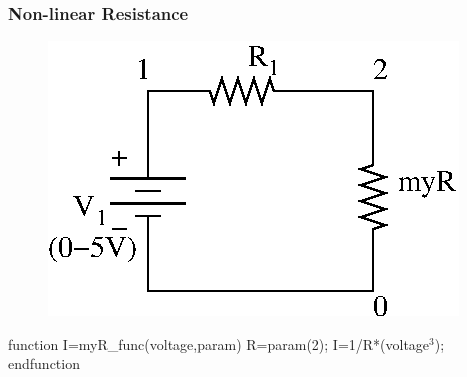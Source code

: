 \documentclass{beamer}
\begin{document}
\begin{frame}
\frametitle{Non-linear Resistance}
\begin{minipage}[!b]{0.43\linewidth} %
\begin{figure}[h]
\centering
\includegraphics[scale=0.7]{../figures/myR.eps}
\end{figure}
\begin{tiny}
function I=myR\_func(voltage,param)\newline
\hspace*{1cm}R=param(2); \newline
\hspace*{1cm}I=1/R*(voltage$^3$);\newline
endfunction 


\end{tiny}
\end{minipage}
\end{frame}
\end{document}
